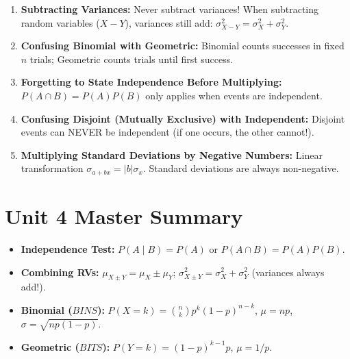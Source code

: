 \begin{trapbox}
\begin{enumerate}[leftmargin=1.2em]
  \item \textbf{Subtracting Variances:} Never subtract variances! When subtracting random variables ($X - Y$), variances still add: $\sigma_{X-Y}^2 = \sigma_X^2 + \sigma_Y^2$.
  \item \textbf{Confusing Binomial with Geometric:} Binomial counts successes in fixed $n$ trials; Geometric counts trials until first success.
  \item \textbf{Forgetting to State Independence Before Multiplying:} $P(A \cap B) = P(A)P(B)$ only applies when events are independent.
  \item \textbf{Confusing Disjoint (Mutually Exclusive) with Independent:} Disjoint events can NEVER be independent (if one occurs, the other cannot!).
  \item \textbf{Multiplying Standard Deviations by Negative Numbers:} Linear transformation $\sigma_{a+bx} = |b|\sigma_x$. Standard deviations are always non-negative.
\end{enumerate}
\end{trapbox}
\section{Unit 4 Master Summary}
\begin{lessonbox}
\begin{itemize}[leftmargin=1.2em]
  \item \textbf{Independence Test:} $P(A \mid B) = P(A)$ or $P(A \cap B) = P(A)P(B)$.
  \item \textbf{Combining RVs:} $\mu_{X \pm Y} = \mu_X \pm \mu_Y$; $\sigma_{X \pm Y}^2 = \sigma_X^2 + \sigma_Y^2$ (variances always add!).
  \item \textbf{Binomial ($BINS$):} $P(X=k) = \binom{n}{k}p^k(1-p)^{n-k}$, $\mu=np$, $\sigma=\sqrt{np(1-p)}$.
  \item \textbf{Geometric ($BITS$):} $P(Y=k) = (1-p)^{k-1}p$, $\mu=1/p$.
\end{itemize}
\end{lessonbox}
\clearpage
